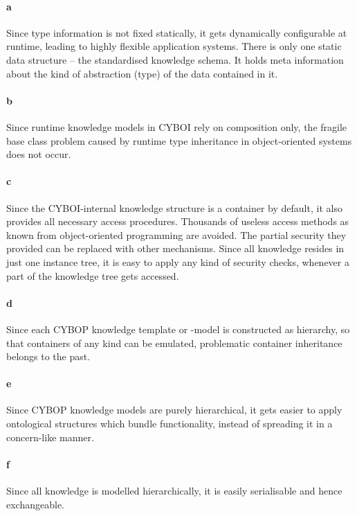 \paragraph{a}

Since type information is not fixed statically, it gets dynamically
configurable at runtime, leading to highly flexible application systems. There
is only one static data structure -- the standardised knowledge schema. It
holds meta information about the kind of abstraction (type) of the data
contained in it.

\paragraph{b}

Since runtime knowledge models in CYBOI rely on composition only, the fragile
base class problem caused by runtime type inheritance in object-oriented systems
does not occur.

\paragraph{c}

Since the CYBOI-internal knowledge structure is a container by default, it
also provides all necessary access procedures. Thousands of useless access
methods as known from object-oriented programming are avoided. The partial
security they provided can be replaced with other mechanisms. Since all
knowledge resides in just one instance tree, it is easy to apply any kind of
security checks, whenever a part of the knowledge tree gets accessed.

\paragraph{d}

Since each CYBOP knowledge template or -model is constructed as hierarchy, so
that containers of any kind can be emulated, problematic container inheritance
belongs to the past.

\paragraph{e}

Since CYBOP knowledge models are purely hierarchical, it gets easier to apply
ontological structures which bundle functionality, instead of spreading it in a
concern-like manner.

\paragraph{f}

Since all knowledge is modelled hierarchically, it is easily serialisable and
hence exchangeable.
